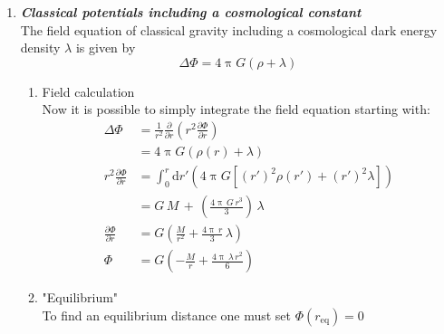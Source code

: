 \documentclass[a4paper,12pt]{article}
\newcommand{\question}[1]{\textbf{\textit{#1}}}
\renewcommand{\pi}{\uppi}
\begin{document}
	\begin{enumerate}
	
			\item \question{Classical potentials including a cosmological constant}\\
		The field equation of classical gravity including a
                cosmological dark energy density $\lambda$ is given by
		\begin{equation}
		\Delta\Phi = 4\pi G(\rho + \lambda)
		\end{equation}
		
		\begin{enumerate}
		\item Field calculation\\
	
		Now it is possible to simply integrate the field equation starting with:
		\begin{align}
		  \Delta\Phi&=\frac{1}{r^{2}}\frac{\partial}{\partial r}\left(r^{2}\frac{\partial\Phi}{\partial r}\right)\\
		  &=4\pi G(\rho(r)+\lambda)\\
		  r^{2}\frac{\partial\Phi}{\partial
                    r}&=\int_0^r\textrm{d}r'\left(4\pi G[\left(r'\right)^{2}\rho\left(r'\right)+\left(r'\right)^{2}\lambda]\right)\\
		  &=G \, M \, + \,  \left(\frac{4\pi\, G \, r^{3}}{3}\right)\,\lambda\\
		  \frac{\partial\Phi}{\partial r}
		  &=G \left(\frac{M}{r^{2}}+\frac{4 \pi \, r}{3} \, \lambda\right)\\
		  \Phi&=G\left(-\frac{M}{r}+\frac{4 \pi \, \lambda\, r^2}{6}\right)
		\end{align}
		
		
		\item "Equilibrium"\\
		
		To find an equilibrium distance one must set \(\Phi\left(r_\textrm{eq}\right)=0\)
		

\end{enumerate}
\end{enumerate}
\end{document}
